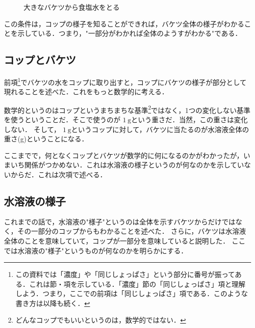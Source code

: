 \documentclass[dvipdfmx]{jsarticle}
\begin{document}
    \begin{figure}[htbp]\centering
        \caption{大きなバケツから食塩水をとる}
        \label{tikz_baketu_shokuensui_sub}
    \end{figure}

    この条件は，コップの様子を知ることができれば，バケツ全体の様子がわかることを示している．つまり，"一部分がわかれば全体のようすがわかる"である．

    \subsection{コップとバケツ}
    前項\footnote{この資料では「濃度」や「同じしょっぱさ」という部分に番号が振ってある．これは節・項を示している．「濃度」節の「同じしょっぱさ」項と理解しよう．つまり，ここでの前項は「同じしょっぱさ」項である．このような書き方は以降も続く．}でバケツの水をコップに取り出すと，コップにバケツの様子が部分として現れることを述べた．これをもっと数学的に考える．

    数学的というのはコップというまちまちな基準\footnote{どんなコップでもいいというのは，数学的ではない．}ではなく，1つの変化しない基準を使うということだ．そこで使うのが \(1\ \mathrm{g}\)という重さだ．当然，この重さは変化しない．
    そして， \(1\ \mathrm{g}\)というコップに対して，バケツに当たるのが水溶液全体の重さ(g)ということになる．

    ここまでで，何となくコップとバケツが数学的に何になるのかがわかったが，いまいち関係がつかめない．これは水溶液の様子というのが何なのかを示していないからだ．これは次項で述べる．

    \subsection{水溶液の様子}
    これまでの話で，水溶液の"様子"というのは全体を示すバケツからだけではなく，その一部分のコップからもわかることを述べた．
    さらに，バケツは水溶液全体のことを意味していて，コップが一部分を意味していると説明した．
    ここでは水溶液の"様子"というものが何なのかを明らかにする．
\end{document}
